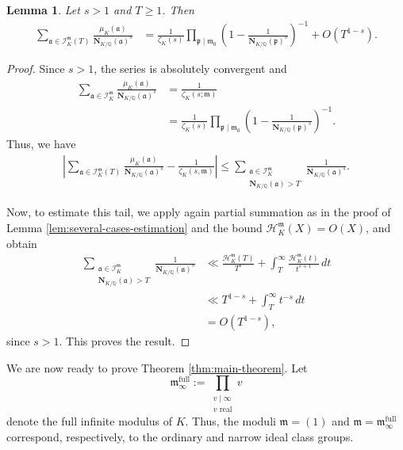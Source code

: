 \documentclass[11pt, reqno]{amsart}
\numberwithin{equation}{section}
\newtheorem{lemma}[theorem]{Lemma}
\newcommand{\Q}{\mathbb{Q}}
\newcommand{\Nrm}[2]{\mathbf{N}_{#1}(#2)}
\theoremstyle{definition}
\begin{document}
\begin{lemma}\label{lem:finite-sum-with-moebius-to-dedekind-zeta}
Let $s>1$ and $T\geq 1$. Then
\begin{align*}
\sum_{\mathfrak{a}\in\mathcal{I}_K^{\mathfrak{m}}(T)}
\frac{\mu_K(\mathfrak{a})}
{\Nrm{K/\Q}{\mathfrak{a}}^s}
&=
\frac{1}{\zeta_K(s)}
\prod_{\mathfrak{p}\mid\mathfrak{m}_0}
\left(
1-\frac{1}{\Nrm{K/\Q}{\mathfrak{p}}^s}
\right)^{-1}
+
O(T^{1-s}).
\end{align*}
\end{lemma}

\begin{proof}
Since $s>1$, the series is absolutely convergent and
\begin{align*}
\sum_{\mathfrak{a}\in\mathcal{I}_K^{\mathfrak{m}}}
\frac{\mu_K(\mathfrak{a})}
{\Nrm{K/\Q}{\mathfrak{a}}^s}
&=
\frac{1}{\zeta_K(s;\mathfrak{m})}\\
&=
\frac{1}{\zeta_K(s)}
\prod_{\mathfrak{p}\mid\mathfrak{m}_0}
\left(
1-\frac{1}{\Nrm{K/\Q}{\mathfrak{p}}^s}
\right)^{-1}.
\end{align*}
Thus, we have
\begin{align*}
\left|
\sum_{\mathfrak{a}\in\mathcal{I}_K^{\mathfrak{m}}(T)}
\frac{\mu_K(\mathfrak{a})}
{\Nrm{K/\Q}{\mathfrak{a}}^s}
- \frac{1}{\zeta_K(s,\mathfrak{m})} \right|
\leq
\sum_{\substack{\mathfrak{a}\in\mathcal{I}_K^{\mathfrak{m}}\\
\Nrm{K/\Q}{\mathfrak{a}}>T}}
\frac{1}{\Nrm{K/\Q}{\mathfrak{a}}^s}.
\end{align*}

Now, to estimate this tail, we apply again partial summation as in the proof of Lemma \ref{lem:several-cases-estimation} and the bound $\mathcal{H}_K^{\mathfrak{m}}(X) =  O(X)$, and obtain
\begin{align*}
\sum_{\substack{\mathfrak{a}\in\mathcal{I}_K^{\mathfrak{m}}\\
\Nrm{K/\Q}{\mathfrak{a}}>T}}
\frac{1}{\Nrm{K/\Q}{\mathfrak{a}}^s}
&\ll
\frac{\mathcal{H}_K^{\mathfrak{m}}(T)}{T^s}
+
\int_T^\infty
\frac{\mathcal{H}_K^{\mathfrak{m}}(t)}{t^{s+1}}\,dt\\
&\ll
T^{1-s}
+
\int_T^\infty t^{-s}\,dt\\
&=
O(T^{1-s}),
\end{align*}
since $s>1$. This proves the result.
\end{proof}


We are now ready to prove Theorem \ref{thm:main-theorem}. Let
\[
\mathfrak{m}_{\infty}^{\mathrm{full}}
:=
\prod_{\substack{v\mid\infty\\ v\text{ real}}} v
\]
denote the full infinite modulus of $K$. Thus, the moduli
$\mathfrak{m}=(1)$ and $\mathfrak{m}=\mathfrak{m}_{\infty}^{\mathrm{full}}$ correspond, respectively, to the ordinary and narrow ideal class groups.
\end{document}

